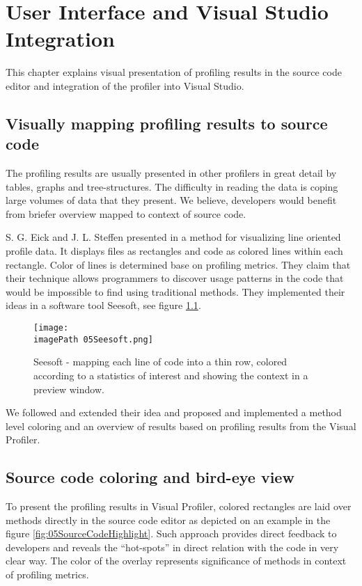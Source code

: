 \chapter{User Interface and Visual Studio Integration }
\label{chap:VPUIandSI}


This chapter explains visual presentation of profiling results in the source code editor and integration of the profiler into Visual Studio.

\section{Visually mapping profiling results to source code}
The profiling results are usually presented in other profilers in great detail by tables, graphs and tree-structures. The difficulty in reading the data is coping large volumes of data that they present. We believe, developers would benefit from briefer overview mapped to context of source code.

S. G. Eick and J. L. Steffen presented in \cite{EickSteffen92} a method for visualizing line oriented profile data. It displays files as rectangles and code as colored lines within each rectangle. Color of lines is determined base on profiling metrics. They claim that their technique allows programmers to discover usage patterns in the code that would be impossible to find using traditional methods. They implemented their ideas in a software tool Seesoft, see figure \ref{fig:05SeeSoft}.

\begin{figure}
	\centering
		\texttt{[image: \\imagePath 05Seesoft.png]}
		\caption{Seesoft - mapping each line of code into a thin row, colored according to a statistics of interest and showing the context in a preview window.}
	\label{fig:05SeeSoft}
\end{figure}


We followed and extended their idea and proposed and implemented a method level coloring and an overview of results based on profiling results from the Visual Profiler. 

\section{Source code coloring and bird-eye view}
To present the profiling results in Visual Profiler, colored rectangles are laid over methods directly in the source code editor as depicted on an example in the figure \ref{fig:05SourceCodeHighlight}. Such approach provides direct feedback to developers and reveals the ``hot-spots'' in direct relation with the code in very clear way.  The color of the overlay represents significance of methods in context of profiling metrics.

